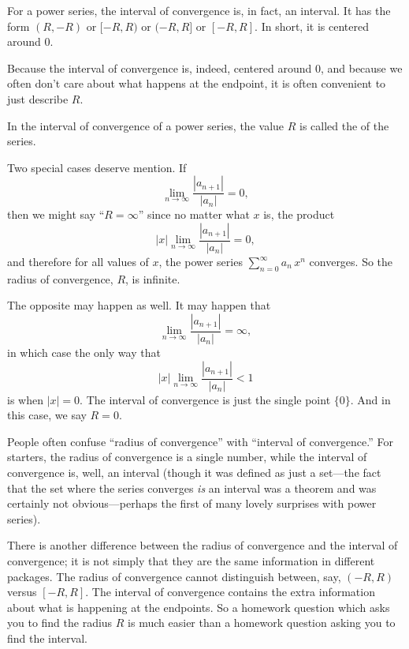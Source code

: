 \begin{theorem}
  \label{thm:convergence-set-is-interval}
  For a power series, the interval of convergence is, in fact, an
  interval.  It has the form $(R,-R)$ or $[-R,R)$ or $(-R,R]$ or
  $[-R,R]$.  In short, it is centered around $0$.
\end{theorem}

Because the interval of convergence is, indeed, centered around $0$,
and because we often don't care about what happens at the endpoint, it
is often convenient to just describe $R$.

\begin{definition}
  In the interval of convergence of a power series, the value $R$ is called
  the  of the series.
\end{definition}

Two special cases deserve mention.  If
$$
\lim_{n\to\infty} \frac{|a_{n+1}|}{|a_n|} = 0,
$$
then we might say ``$R = \infty$'' since no matter what $x$ is, the product
$$
|x| \lim_{n\to\infty} \frac{|a_{n+1}|}{|a_n|} = 0,
$$
and therefore for all values of $x$, the power series
$\sum_{n=0}^\infty a_n \, x^n$ converges.  So the radius of
convergence, $R$, is infinite.

The opposite may happen as well.  It may happen that
$$
\lim_{n\to\infty} \frac{|a_{n+1}|}{|a_n|} = \infty,
$$
in which case the only way that 
$$
|x| \lim_{n\to\infty} \frac{|a_{n+1}|}{|a_n|} < 1
$$
is when $|x| = 0$.  The interval of convergence is just the single
point $\{0\}$.  And in this case, we say $R = 0$.

\begin{warning}
  People often confuse ``radius of convergence'' with ``interval of
  convergence.''  For starters, the radius of convergence is a single
  number, while the interval of convergence is, well, an interval
  (though it was defined as just a set---the fact that the set where
  the series converges \textit{is} an interval was a theorem and was
  certainly not obvious---perhaps the first of many lovely surprises
  with power series).

  There is another difference between the radius of convergence and
  the interval of convergence; it is not simply that they are the same
  information in different packages.  The radius of convergence cannot
  distinguish between, say, $(-R,R)$ versus $[-R,R]$.  The interval of
  convergence contains the extra information about what is happening
  at the endpoints.  So a homework question which asks you to find the
  radius $R$ is much easier than a homework question asking you to
  find the interval.
\end{warning}

